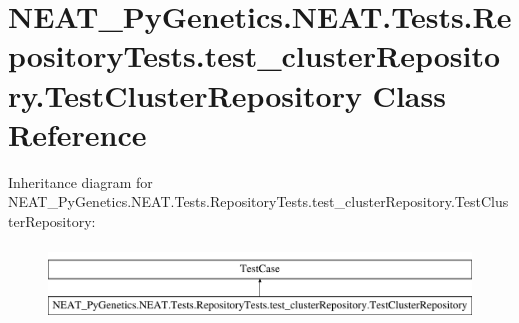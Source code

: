 \hypertarget{class_n_e_a_t___py_genetics_1_1_n_e_a_t_1_1_tests_1_1_repository_tests_1_1test__cluster_repository_1_1_test_cluster_repository}{}\section{N\+E\+A\+T\+\_\+\+Py\+Genetics.\+N\+E\+A\+T.\+Tests.\+Repository\+Tests.\+test\+\_\+cluster\+Repository.\+Test\+Cluster\+Repository Class Reference}
\label{class_n_e_a_t___py_genetics_1_1_n_e_a_t_1_1_tests_1_1_repository_tests_1_1test__cluster_repository_1_1_test_cluster_repository}
Inheritance diagram for N\+E\+A\+T\+\_\+\+Py\+Genetics.\+N\+E\+A\+T.\+Tests.\+Repository\+Tests.\+test\+\_\+cluster\+Repository.\+Test\+Cluster\+Repository\+:\begin{figure}[H]
\begin{center}
\leavevmode
\includegraphics[height=2.000000cm]{class_n_e_a_t___py_genetics_1_1_n_e_a_t_1_1_tests_1_1_repository_tests_1_1test__cluster_repository_1_1_test_cluster_repository}
\end{center}
\end{figure}
